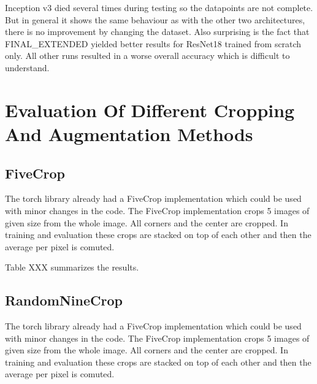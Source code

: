 Inception v3 died several times during testing so the datapoints are not complete. But in general it shows the same behaviour as with the other two architectures, there is no improvement by changing the dataset. Also surprising is the fact that FINAL\_EXTENDED yielded better results for ResNet18 trained from scratch only. All other runs resulted in a worse overall accuracy which is difficult to understand.

\section{Evaluation Of Different Cropping And Augmentation Methods}

\subsection{FiveCrop}

The torch library already had a FiveCrop implementation which could be used with minor changes in the code. The FiveCrop implementation crops 5 images of given size from the whole image. All corners and the center are cropped. In training and evaluation these crops are stacked on top of each other and then the average per pixel is comuted.

Table XXX summarizes the results.

\begin{table}[h] \centering
{}
\caption{Resnet18 FiveCrop Implementation with and without pre-training. FINAL (regular) means ResNet18 with the resizing of the image instead of cropping and averaging}
\label{tbl:resnet18-fivecrop}
\end{table}

\subsection{RandomNineCrop}

The torch library already had a FiveCrop implementation which could be used with minor changes in the code. The FiveCrop implementation crops 5 images of given size from the whole image. All corners and the center are cropped. In training and evaluation these crops are stacked on top of each other and then the average per pixel is comuted.

